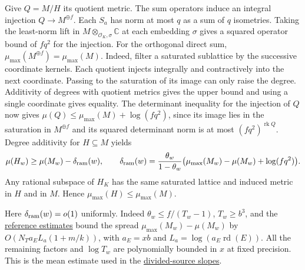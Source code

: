 \leavevmode{}%
Give \(Q=M/H\) its quotient metric. The sum operators induce an
integral injection \(Q\to M^{\oplus f}\). Each \(S_a\) has norm
at most \(q\) as a sum of \(q\) isometries. Taking the least-norm
lift in \(M\otimes_{\mathcal O_K,\sigma}\mathbb C\) at each
embedding \(\sigma\) gives a squared operator bound of \(fq^2\)
for the injection. For the orthogonal direct sum,
\(\mu_{\max}(M^{\oplus f})=\mu_{\max}(M)\). Indeed, filter a
saturated sublattice by the successive coordinate kernels. Each
quotient injects integrally and contractively into the next
coordinate. Passing to the saturation of its image can only
raise the degree. Additivity of degrees with quotient metrics
gives the upper bound and using a single coordinate gives equality.
The determinant inequality for the injection of \(Q\) now gives
\(\mu(Q)\le\mu_{\max}(M)+\log(fq^2)\), since its image lies in the
saturation in \(M^{\oplus f}\) and its squared determinant norm
is at most \((fq^2)^{\operatorname{rk}Q}\).
Degree additivity for \(H\subseteq M\) yields
\begin{equation}
\label{eq:ramified-quotient-bound}
 \mu(H_w)\ge\mu(M_w)-\delta_{\rm ram}(w),\qquad
 \delta_{\rm ram}(w)=\frac{\theta_w}{1-\theta_w}
  \bigl(\mu_{\max}(M_w)-\mu(M_w)+\log(fq^2)\bigr).
\end{equation}
Any rational subspace of \(H_K\) has the same saturated lattice
and induced metric in \(H\) and in \(M\). Hence
\(\mu_{\max}(H)\le\mu_{\max}(M)\).

Here \(\delta_{\rm ram}(w)=o(1)\) uniformly. Indeed
\(\theta_w\le f/(T_w-1)\), \(T_w\ge b^3\), and the
\hyperlink{proof.reference-schur-slopes}{reference estimates}
bound the spread \(\mu_{\max}(M_w)-\mu(M_w)\) by
\(O(N_Ta_E L_a(1+m/k))\), with \(a_E=xb\) and
\(L_a=\log(a_E\operatorname{rd}(E))\).
All the remaining factors and \(\log T_w\) are polynomially
bounded in \(x\) at fixed precision. This is the mean estimate
used in the \hyperlink{proof.divided-column-slopes}{divided-source slopes}.

